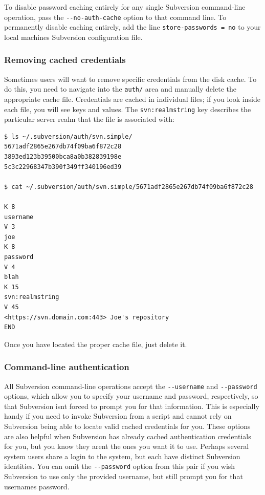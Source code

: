 To disable password caching entirely for any single Subversion
command-line operation, pass the \texttt{-\/-no-auth-cache} option to
that command line. To permanently disable caching entirely, add the line
\texttt{store-passwords\ =\ no} to your local machine\textquotesingle s
Subversion configuration file.

\subsubsection{Removing cached
credentials}\label{svn.tour.initial.authn-cache-purge}

Sometimes users will want to remove specific credentials from the disk
cache. To do this, you need to navigate into the \texttt{auth/} area and
manually delete the appropriate cache file. Credentials are cached in
individual files; if you look inside each file, you will see keys and
values. The \texttt{svn:realmstring} key describes the particular server
realm that the file is associated with:

\begin{verbatim}
$ ls ~/.subversion/auth/svn.simple/
5671adf2865e267db74f09ba6f872c28
3893ed123b39500bca8a0b382839198e
5c3c22968347b390f349ff340196ed39

$ cat ~/.subversion/auth/svn.simple/5671adf2865e267db74f09ba6f872c28

K 8
username
V 3
joe
K 8
password
V 4
blah
K 15
svn:realmstring
V 45
<https://svn.domain.com:443> Joe's repository
END
\end{verbatim}

Once you have located the proper cache file, just delete it.

\subsubsection{Command-line
authentication}\label{svn.tour.initial.different-user}

All Subversion command-line operations accept the \texttt{-\/-username}
and \texttt{-\/-password} options, which allow you to specify your
username and password, respectively, so that Subversion
isn\textquotesingle t forced to prompt you for that information. This is
especially handy if you need to invoke Subversion from a script and
cannot rely on Subversion being able to locate valid cached credentials
for you. These options are also helpful when Subversion has already
cached authentication credentials for you, but you know they
aren\textquotesingle t the ones you want it to use. Perhaps several
system users share a login to the system, but each have distinct
Subversion identities. You can omit the \texttt{-\/-password} option
from this pair if you wish Subversion to use only the provided username,
but still prompt you for that username\textquotesingle s password.

